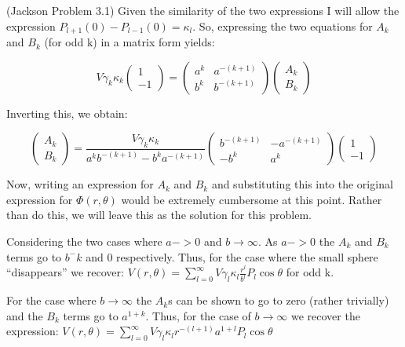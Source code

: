 \begin{homeworkProblem}{(Jackson Problem 3.1)}
Given the similarity of the two expressions I will allow the expression $P_{l+1}(0)-P_{l-1}(0) = \kappa_l$. So, expressing the two equations for $A_{k}$ and $B_{k}$ (for odd k) in a matrix form yields:

\[
V\gamma_k \kappa_k
\begin{pmatrix}
1 \\ -1
\end{pmatrix}
=
\begin{pmatrix}
a^k & a^{-(k+1)} \\
b^k & b^{-(k+1)}
\end{pmatrix}
\begin{pmatrix}
	A_k \\ B_k
\end{pmatrix}
\]

Inverting this, we obtain:

\[
\begin{pmatrix}
	A_k \\ B_k
\end{pmatrix}
=
\frac{V\gamma_k \kappa_k}{a^k b^{-(k+1)} - b^k a^{-(k+1)}}
\begin{pmatrix}
b^{-(k+1)} & -a^{-(k+1)} \\
-b^k & a^k
\end{pmatrix}
\begin{pmatrix}
	1 \\ -1
\end{pmatrix}
\]

Now, writing an expression for $A_k$ and $B_k$ and substituting this into the original expression for $\Phi(r,\theta)$ would be extremely cumbersome at this point. Rather than do this, we will leave this as the solution for this problem.
\\ \par
Considering the two cases where $a->0$ and $b \rightarrow \infty$. As $a->0$ the $A_k$ and $B_k$ terms go to $b^-k$ and 0 respectively. Thus, for the case where the small sphere ``disappears'' we recover: $V(r,\theta) = \sum\limits_{l=0}^\infty V\gamma_l \kappa_l\frac{r^l}{b^l}P_l\cos\theta$ for odd k.
\\ \par
For the case where $b \rightarrow \infty$ the $A_k$s can be shown to go to zero (rather trivially) and the $B_k$ terms go to $a^{1+k}$. Thus, for the case of $b \rightarrow \infty$ we recover the expression: $V(r,\theta) = \sum\limits_{l=0}^\infty V\gamma_l \kappa_l r^{-(l+1)} a^{1+l}P_l\cos\theta$

\end{homeworkProblem}
